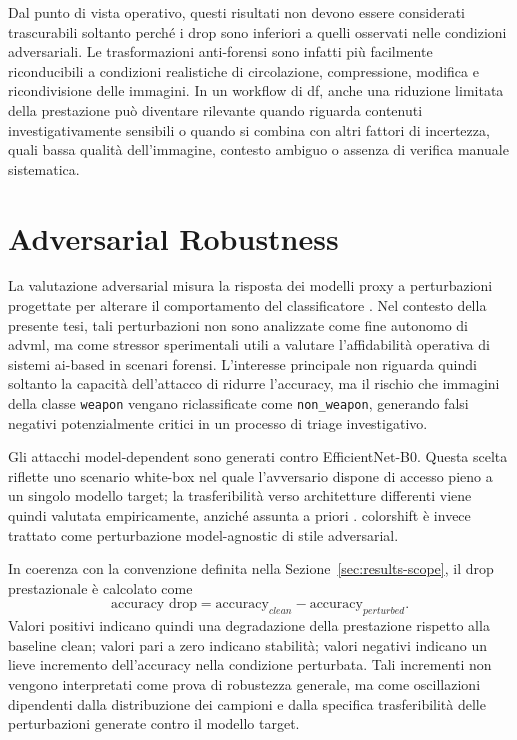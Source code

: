 Dal punto di vista operativo, questi risultati non devono essere considerati
trascurabili soltanto perché i drop sono inferiori a quelli osservati nelle
condizioni adversariali. Le trasformazioni anti-forensi sono infatti più
facilmente riconducibili a condizioni realistiche di circolazione, compressione,
modifica e ricondivisione delle immagini. In un workflow di \gls{df}, anche una
riduzione limitata della prestazione può diventare rilevante quando riguarda
contenuti investigativamente sensibili o quando si combina con altri fattori di
incertezza, quali bassa qualità dell'immagine, contesto ambiguo o assenza di
verifica manuale sistematica.



\section{Adversarial Robustness}
\label{sec:results-adversarial}

La valutazione adversarial misura la risposta dei modelli proxy a perturbazioni
progettate per alterare il comportamento del classificatore
\cite{szegedy2014intriguing,goodfellow2015explaining,biggio2018wild}. Nel
contesto della presente tesi, tali perturbazioni non sono analizzate come fine
autonomo di \gls{advml}, ma come stressor sperimentali utili a valutare
l'affidabilità operativa di sistemi \gls{ai}-based in scenari forensi.
L'interesse principale non riguarda quindi soltanto la capacità dell'attacco di
ridurre l'accuracy, ma il rischio che immagini della classe \texttt{weapon}
vengano riclassificate come \texttt{non\_weapon}, generando falsi negativi
potenzialmente critici in un processo di triage investigativo.

Gli attacchi model-dependent sono generati contro EfficientNet-B0. Questa scelta
riflette uno scenario white-box nel quale l'avversario dispone di accesso pieno a
un singolo modello target; la trasferibilità verso architetture differenti viene
quindi valutata empiricamente, anziché assunta a priori
\cite{biggio2018wild,nowroozi2021survey,barni2018cf}. \gls{colorshift} è invece
trattato come perturbazione model-agnostic di stile adversarial.

In coerenza con la convenzione definita nella
Sezione~\ref{sec:results-scope}, il drop prestazionale è calcolato come
\[
\text{accuracy drop} =
\text{accuracy}_{clean} - \text{accuracy}_{perturbed}.
\]
Valori positivi indicano quindi una degradazione della prestazione rispetto alla
baseline clean; valori pari a zero indicano stabilità; valori negativi indicano
un lieve incremento dell'accuracy nella condizione perturbata. Tali incrementi
non vengono interpretati come prova di robustezza generale, ma come oscillazioni
dipendenti dalla distribuzione dei campioni e dalla specifica trasferibilità
delle perturbazioni generate contro il modello target.

